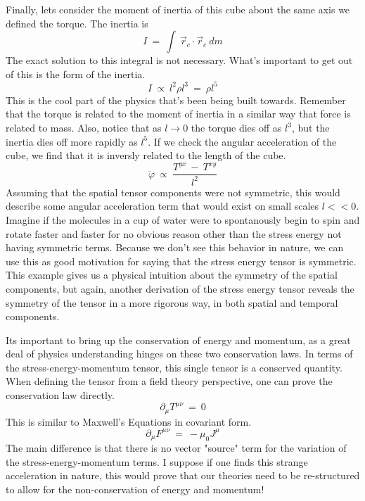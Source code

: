 \hskip 25pt Finally, lets consider the moment of inertia of this cube about the same axis we defined the torque.  The
inertia is
\begin{equation}
  I\ =\ \int\ \vec{r}_c\cdot\vec{r}_c\ dm
\end{equation}
The exact solution to this integral is not necessary.  What's important to get out of this is the form of the inertia.
\begin{equation}
  I\ \propto\ l^2\rho l^3\ =\ \rho l^5
\end{equation}
This is the cool part of the physics that's been being built towards.  Remember that the torque is related to the
moment of inertia in a similar way that force is related to mass.  Also, notice that as $l\rightarrow0$ the
torque dies off as $l^3$, but the inertia dies off more rapidly as $l^5$.  If we check the angular acceleration of the
cube, we find that it is inversly related to the length of the cube.
\begin{equation}
  \ddot{\varphi}\ \propto\ \frac{T^{yx}\ -\ T^{xy}}{l^2}
\end{equation}
Assuming that the spatial tensor components were not symmetric, this would describe some angular acceleration term that
would exist on small scales $l << 0$.  Imagine if the molecules in a cup of water were to spontanously begin to spin and
rotate faster and faster for no obvious reason other than the stress energy not having symmetric terms.  Because we don't
see this behavior in nature, we can use this as good motivation for saying that the stress energy tensor is symmetric.
This example gives us a physical intuition about the symmetry of the spatial components, but again, another
derivation of the stress energy tensor reveals the symmetry of the tensor in a more rigorous way, in both spatial and
temporal components.  

\hskip 25pt Its important to bring up the conservation of energy and momentum, as a great deal of physics understanding
hinges on these two conservation laws.  In terms of the stress-energy-momentum tensor, this single tensor is a conserved
quantity.  When defining the tensor from a field theory perspective, one can prove the conservation law directly.
\begin{equation}
  \partial_{\mu}T^{\mu\nu}\ =\ 0
\end{equation}
This is similar to Maxwell's Equations in covariant form.
\begin{equation}
  \partial_{\mu}F^{\mu\nu}\ =\ -\mu_0J^{\mu}
\end{equation}
The main difference is that there is no vector "source" term for the variation of the stress-energy-momentum terms.
I suppose if one finds this strange acceleration in nature, this would prove that our theories need to be
re-structured to allow for the non-conservation of energy and momentum!

